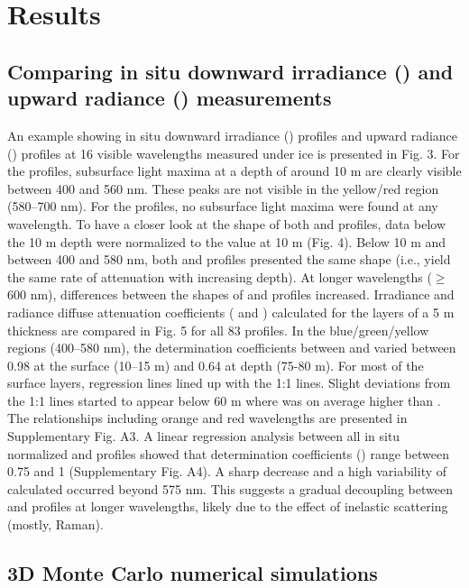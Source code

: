 \section{Results}

\subsection{Comparing in situ downward irradiance (\ed{}) and upward radiance (\lu{}) measurements}

An example showing in situ downward irradiance (\ed{}) profiles and upward radiance (\lu{}) profiles at 16 visible wavelengths measured under ice is presented in Fig. 3. For the \ed{} profiles, subsurface light maxima at a depth of around 10 m are clearly visible between 400 and 560 nm. These peaks are not visible in the yellow/red region (580--700 nm). For the \lu{} profiles, no subsurface light maxima were found at any wavelength. To have a closer look at the shape of both \ed{} and \lu{} profiles, data below the 10 m depth were normalized to the value at 10 m (Fig. 4). Below 10 m and between 400 and 580 nm, both \ed{} and \lu{} profiles presented the same shape (i.e., yield the same rate of attenuation with increasing depth). At longer wavelengths ($\ge$ 600 nm), differences between the shapes of \ed{} and \lu{} profiles increased. Irradiance and radiance diffuse attenuation coefficients (\ked{} and \klu{}) calculated for the layers of a 5 m thickness are compared in Fig. 5 for all 83 profiles. In the blue/green/yellow regions (400--580 nm), the determination coefficients between \klu{} and \ked{} varied between 0.98 at the surface (10--15 m) and 0.64 at depth (75-80 m). For most of the surface layers, regression lines lined up with the 1:1 lines. Slight deviations from the 1:1 lines started to appear below 60 m where \ked{} was on average higher than \klu{}. The relationships including orange and red wavelengths are presented in Supplementary Fig. A3. A linear regression analysis between all in situ normalized \ed{} and \lu{} profiles showed that determination coefficients (\rsquared{}) range between 0.75 and 1 (Supplementary Fig. A4). A sharp decrease and a high variability of calculated \rsquared{} occurred beyond 575 nm. This suggests a gradual decoupling between \ed{} and \lu{} profiles at longer wavelengths, likely due to the effect of inelastic scattering (mostly, Raman). 

\subsection{3D Monte Carlo numerical simulations}

